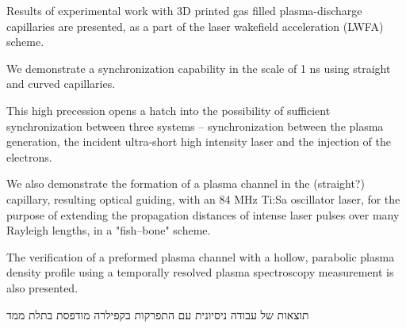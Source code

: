 \documentclass[../main.tex]{subfiles}
\begin{document}
Results of experimental work with 3D printed gas filled plasma-discharge capillaries are presented, as a part of the laser wakefield acceleration (LWFA) scheme.

We demonstrate a synchronization capability in the scale of 1 ns using straight and curved capillaries. 

This high precession opens a hatch into the possibility of sufficient synchronization between three systems -- synchronization between the plasma generation, the incident ultra-short high intensity laser and the injection of the electrons.

We also demonstrate the formation of a plasma channel in the (straight?) capillary, resulting optical guiding, with an 84 MHz Ti:Sa oscillator laser, for the purpose of extending the propagation distances of intense laser pulses over many Rayleigh lengths, in a "fish--bone" scheme.

The verification of a preformed plasma channel with a hollow, parabolic plasma density profile using a temporally resolved plasma spectroscopy measurement is also presented.


תוצאות של עבודה ניסיונית עם התפרקות בקפילרה מודפסת בתלת ממד
\end{document}
